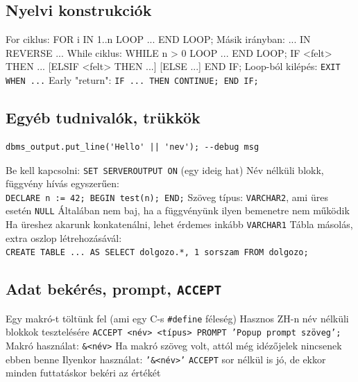 \documentclass[12pt,a4paper]{article}
\begin{document}
\subsection{Nyelvi konstrukciók}

\begin{outline}
	\1 For ciklus: FOR i IN 1..n LOOP ... END LOOP;
		\2 Másik irányban: ... IN REVERSE ...
	\1 While ciklus: WHILE n > 0 LOOP ... END LOOP;
	\1 IF <felt> THEN ... [ELSIF <felt> THEN ...] [ELSE ...] END IF;
	\1 Loop-ból kilépés: \texttt{EXIT WHEN ...}
	\1 Early "return": \texttt{IF ... THEN CONTINUE; END IF;}
\end{outline}

\pagebreak

\subsection{Egyéb tudnivalók, trükkök}

\begin{outline}
	\1 \begin{verbatim}dbms_output.put_line('Hello' || 'nev'); --debug msg\end{verbatim}
		\2 Be kell kapcsolni: \texttt{SET SERVEROUTPUT ON} (egy ideig hat)
	\1 Név nélküli blokk, függvény hívás egyszerűen:\\
	\texttt{DECLARE n := 42; BEGIN test(n); END;}
	\1 Szöveg típus: \texttt{VARCHAR2}, ami üres esetén \texttt{NULL}
		\2 Általában nem baj, ha a függvényünk ilyen bemenetre nem működik
		\2 Ha üreshez akarunk konkatenálni, lehet érdemes inkább \texttt{VARCHAR1}
	\1 Tábla másolás, extra oszlop létrehozásávál:\\
	\texttt{CREATE TABLE ... AS SELECT dolgozo.*, 1 sorszam FROM dolgozo;}
\end{outline}

\subsection{Adat bekérés, prompt, \texttt{ACCEPT}}

\begin{outline}
	\1 Egy makró-t töltünk fel (ami egy C-s \verb|#define| féleség)
	\1 Hasznos ZH-n név nélküli blokkok tesztelésére
	\1 \texttt{ACCEPT <név> <típus> PROMPT 'Popup prompt szöveg';}
	\1 Makró használat: \texttt{\&<név>}
		\2 Ha makró szöveg volt, attól még idézőjelek nincsenek ebben benne
		\2 Ilyenkor használat: \texttt{'\&<név>'}
	\1 \texttt{ACCEPT} sor nélkül is jó, de ekkor minden futtatáskor bekéri az értékét
\end{outline}
\end{document}
